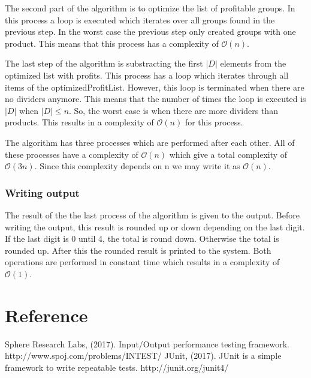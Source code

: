 \documentclass{article}
\newcommand{\bigO}[1]{\mathcal{O}(#1)}
\begin{document}
The second part of the algorithm is to optimize the list of profitable groups. In this process a loop is executed which iterates over all groups found in the previous step. In the worst case the previous step only created groups with one product. This means that this process has a complexity of $\bigO{n}$.

The last step of the algorithm is substracting the first $|D|$ elements from the optimized list with profits. This process has a loop which iterates through all items of the optimizedProfitList. However, this loop is terminated when there are no dividers anymore. This means that the number of times the loop is executed is $|D|$ when $|D| \leq n$. So, the worst case is when there are more dividers than products. This results in a complexity of $\bigO{n}$ for this process.

The algorithm has three processes which are performed after each other. All of these processes have a complexity of $\bigO{n}$ which give a total complexity of $\bigO{3n}$. Since this complexity depends on n we may write it as $\bigO{n}$.

\subsubsection{Writing output}
The result of the the last process of the algorithm is given to the output. Before writing the output, this result is rounded up or down depending on the last digit. If the last digit is 0 until 4, the total is round down. Otherwise the total is rounded up. After this the rounded result is printed to the system. Both operations are performed in constant time which results in a complexity of $\bigO{1}$.

\newpage
\section{Reference}
Sphere Research Labs, (2017). Input/Output performance testing framework. \newline
http://www.spoj.com/problems/INTEST/
\newline
\newline
JUnit, (2017). JUnit is a simple framework to write repeatable tests. \newline
http://junit.org/junit4/
\end{document}
